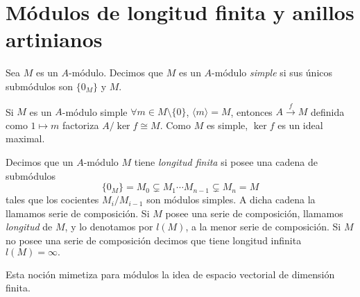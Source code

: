 \documentclass[../main.tex]{subfiles}
\begin{document}
\section{Módulos de longitud finita y anillos artinianos}
\begin{definition}
Sea $M$ es un $A$-módulo. Decimos que $M$ es un $A$-módulo \textit{simple} si sus únicos submódulos son $\{0_M\}$ y $M.$
\end{definition}

\begin{remark}
Si $M$ es un $A$-módulo simple $\forall m\in M\setminus\{0\}$, $\langle m\rangle=M$, entonces $A\overset{f}{\rightarrow} M$ definida como $1\mapsto m$ factoriza $A/\ker{f}\cong M.$ Como $M$ es simple, $\ker f$ es un ideal maximal.
\end{remark}

\begin{definition}
Decimos que un $A$-módulo $M$ tiene \textit{longitud finita} si posee una cadena de submódulos
$$\{0_M\}=M_0\subsetneq M_1\cdots M_{n-1}\subsetneq M_n=M$$
tales que los cocientes $M_i/M_{i-1}$ son módulos simples. A dicha cadena la llamamos serie de composición. Si $M$ posee una serie de composición, llamamos \textit{longitud} de $M$, y lo denotamos por $l(M)$, a la menor serie de composición. Si $M$ no posee una serie de composición decimos que tiene longitud infinita $l(M)=\infty.$
\end{definition}

Esta noción mimetiza para módulos la idea de espacio vectorial de dimensión finita.
\end{document}
